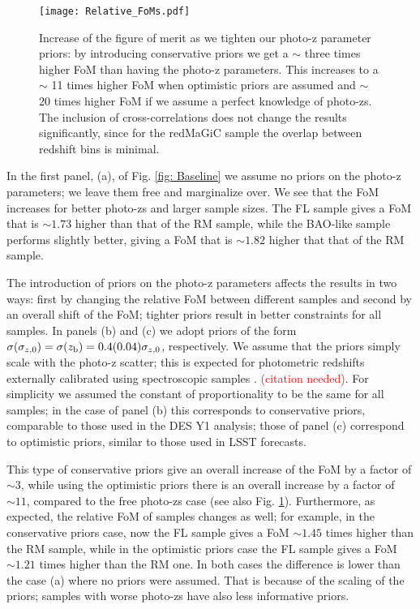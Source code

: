\documentclass[a4paper,fleqn,usenatbib]{mnras}
\begin{document}
\begin{figure}
\centering
\texttt{[image: Relative\_FoMs.pdf]} 
\caption{Increase of the figure of merit as we tighten our photo-z parameter priors: by introducing conservative priors we get a $\sim$ three times higher FoM than having the photo-z parameters. This increases to a $\sim$ 11 times higher FoM when optimistic priors are assumed and $\sim$ 20 times higher FoM if we assume a perfect knowledge of photo-zs. The inclusion of cross-correlations does not change the results significantly, since for the redMaGiC sample the overlap between redshift bins is minimal.}
\label{fig: Norm_increase}
\end{figure}

In the first panel, (a), of Fig. \ref{fig: Baseline} we assume no priors on the photo-z parameters; we leave them free and marginalize over. We see that the FoM increases for better photo-zs and larger sample sizes. The FL sample gives a FoM that is $\sim 1.73$ higher than that of the RM sample, while the BAO-like sample performs slightly better, giving a FoM that is $\sim 1.82$ higher that that of the RM sample.

The introduction of priors on the photo-z parameters affects the results in two ways: first by changing the relative FoM between different samples and second by an overall shift of the FoM; tighter priors result in better constraints for all samples. In panels (b) and (c) we adopt priors of the form $\sigma(\sigma_{z,0}) = \sigma(z_{\mbox{\scriptsize{b}}}) = 0.4(0.04)\sigma_{z,0}$, respectively. We assume that the priors simply scale with the photo-z scatter; this is expected for photometric redshifts externally calibrated using spectroscopic samples . \textcolor{red}{(citation needed)}. For simplicity we assumed the constant of proportionality to be the same for all samples; in the case of panel (b) this corresponds to conservative priors, comparable to those used in the DES Y1 analysis; those of panel (c) correspond to optimistic priors, similar to those used in LSST forecasts.

This type of conservative priors give an overall increase of the FoM by a factor of $\sim 3$, while using the optimistic priors there is an overall increase by a factor of $\sim 11$, compared to the free photo-zs case (see also Fig. \ref{fig: Norm_increase}). Furthermore, as expected, the relative FoM of samples changes as well; for example, in the conservative priors case, now the FL sample gives a FoM $\sim 1.45$ times higher than the RM sample, while in the optimistic priors case the FL sample gives a FoM $\sim 1.21$ times higher than the RM one. In both cases the difference is lower than the case (a) where no priors were assumed. That is because of the scaling of the priors; samples with worse photo-zs have also less informative priors.
\end{document}
